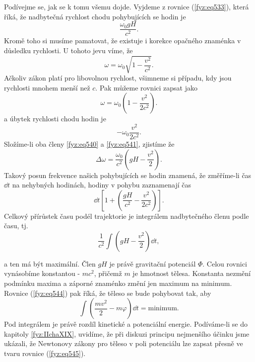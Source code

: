 {    Podívejme se, jak se k tomu všemu dojde. Vyjdeme z rovnice (\ref{fyz:eq533}), která říká, že 
    nadbytečná rychlost chodu pohybujících se hodin je    
    \begin{equation}\label{fyz:eq540}
      \dfrac{\omega_0gH}{c^2}.
    \end{equation}
    Kromě toho si musíme pamatovat, že existuje i korekce opačného znaménka v důsledku rychlosti. U 
    tohoto jevu víme, že    
    \begin{equation*}
      \omega = \omega_0\sqrt{1 - \dfrac{v^2}{c^2}}.
    \end{equation*}
    Ačkoliv zákon platí pro libovolnou rychlost, všimneme si případu, kdy jsou rychlosti mnohem 
    menší než \(c\). Pak můžeme rovnici zapsat jako
    \begin{equation*}
      \omega = \omega_0\left(1 - \dfrac{v^2}{2c^2}\right).
    \end{equation*}
    a úbytek rychlosti chodu hodin je
    \begin{equation}\label{fyz:eq541}
      -\omega_0\dfrac{v^2}{2c^2}.
    \end{equation}
    Složíme-li oba členy \ref{fyz:eq540} a \ref{fyz:eq541}, zjistíme že 
    \begin{equation}\label{fyz:eq542}
      \Delta\omega = \dfrac{\omega_0}{c^2}\left(gH - \dfrac{v^2}{2}\right).
    \end{equation}
    Takový posun frekvence našich pohybujících se hodin znamená, že změříme-li čas \(\dd{t}\) na 
    nehybných hodinách, hodiny v pohybu zaznamenají čas
    \begin{equation}\label{fyz:eq543}
     \dd{t}\left[1 + \left(\dfrac{gH}{c^2} - \dfrac{v^2}{2c^2}\right)\right].
    \end{equation}
    Celkový přírůstek času podél trajektorie je integrálem nadbytečného členu podle času, tj.
    \begin{equation}\label{fyz:eq544}
      \dfrac{1}{c^2}\int\left(gH - \frac{v^2}{2}\right)\dd{t},
    \end{equation}

    a ten má být maximální. Člen \(gH\) je právě gravitační potenciál \(\varPhi\). Celou rovnici 
    vynásobíme konstantou - \(mc^2\), přičemž \(m\) je hmotnost tělesa. Konstanta nezmění podmínku 
    maxima a záporné znaménko změní jen maximum na minimum. Rovnice (\ref{fyz:eq544}) pak říká, že 
    těleso se bude pohybovat tak, aby
    \begin{equation}\label{fyz:eq545}
      \int\left(\dfrac{mv^2}{2} - m\varphi\right)\dd{t} = \text{minimum}.
    \end{equation}
    Pod integrálem je právě rozdíl kinetické a potenciální energie. Podíváme-li se do kapitoly 
    \ref{fyz:IIchaXIX}, uvidíme, že při diskuzi principu nejmenšího účinku jsme ukázali, že 
    Newtonovy zákony pro těleso v poli potenciálu lze zapsat přesně ve tvaru rovnice 
    (\ref{fyz:eq545}).
    
}
